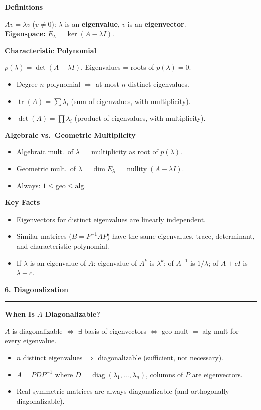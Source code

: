 \documentclass[10pt,twocolumn]{article}
\newcommand{\sect}[1]{\medskip\noindent\textbf{\large #1}\medskip\hrule\smallskip}
\newcommand{\subsect}[1]{\smallskip\noindent\textbf{#1}\par}
\DeclareMathOperator{\nullity}{nullity}
\DeclareMathOperator{\tr}{tr}
\DeclareMathOperator{\diag}{diag}
\begin{document}
\subsect{Definitions}
$Av=\lambda v$ ($v\neq 0$): $\lambda$ is an \textbf{eigenvalue}, $v$ is an \textbf{eigenvector}.\\
\textbf{Eigenspace:} $E_\lambda=\ker(A-\lambda I)$.

\subsect{Characteristic Polynomial}
$p(\lambda)=\det(A-\lambda I)$. Eigenvalues = roots of $p(\lambda)=0$.
\begin{itemize}[nosep,leftmargin=*]
\item Degree $n$ polynomial $\Rightarrow$ at most $n$ distinct eigenvalues.
\item $\tr(A)=\sum\lambda_i$ (sum of eigenvalues, with multiplicity).
\item $\det(A)=\prod\lambda_i$ (product of eigenvalues, with multiplicity).
\end{itemize}

\subsect{Algebraic vs.\ Geometric Multiplicity}
\begin{itemize}[nosep,leftmargin=*]
\item Algebraic mult.\ of $\lambda=$ multiplicity as root of $p(\lambda)$.
\item Geometric mult.\ of $\lambda=\dim E_\lambda=\nullity(A-\lambda I)$.
\item Always: $1\le\text{geo}\le\text{alg}$.
\end{itemize}

\subsect{Key Facts}
\begin{itemize}[nosep,leftmargin=*]
\item Eigenvectors for distinct eigenvalues are linearly independent.
\item Similar matrices ($B=P^{-1}AP$) have the same eigenvalues, trace, determinant, and characteristic polynomial.
\item If $\lambda$ is an eigenvalue of $A$: eigenvalue of $A^k$ is $\lambda^k$; of $A^{-1}$ is $1/\lambda$; of $A+cI$ is $\lambda+c$.
\end{itemize}

\sect{6. Diagonalization}

\subsect{When Is $A$ Diagonalizable?}
$A$ is diagonalizable $\iff$ $\exists$ basis of eigenvectors $\iff$ geo mult $=$ alg mult for every eigenvalue.
\begin{itemize}[nosep,leftmargin=*]
\item $n$ distinct eigenvalues $\Rightarrow$ diagonalizable (sufficient, not necessary).
\item $A=PDP^{-1}$ where $D=\diag(\lambda_1,\ldots,\lambda_n)$, columns of $P$ are eigenvectors.
\item Real symmetric matrices are always diagonalizable (and orthogonally diagonalizable).
\end{itemize}
\end{document}
